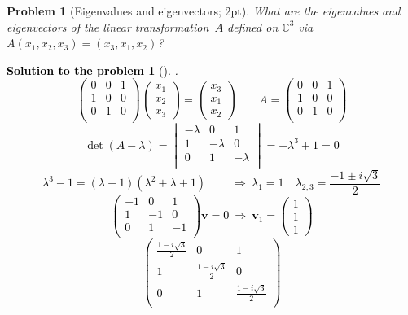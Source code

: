 \documentclass[12pt,a4]{article}
\newtheorem{problem}{Problem}
\newtheorem{solution}{Solution to the problem}
\newcommand{\bv}{{\mathbf v}}
\begin{document}
\begin{problem}[Eigenvalues and eigenvectors; 2pt]\rm 
		What are the eigenvalues and eigenvectors of the
		linear transformation~$A$ defined on $\mathbb{C}^3$ via
 	$A(x_1,x_2,x_3) =  (x_3,x_1,x_2)$?
\end{problem}

\textcolor{black}{
\begin{solution}[]\rm .
\[
\begin{pmatrix}
0 & 0 & 1 \\
1 & 0 & 0 \\
0 & 1 & 0 \\
\end{pmatrix}
\begin{pmatrix}
x_1 \\ x_2 \\ x_3
\end{pmatrix}
=
\begin{pmatrix}
x_3 \\ x_1 \\ x_2
\end{pmatrix}
\qquad
A = 
\begin{pmatrix}
0 & 0 & 1 \\
1 & 0 & 0 \\
0 & 1 & 0 \\
\end{pmatrix}
\]
\[
\det (A - \lambda) = 
\begin{vmatrix}
-\lambda & 0 & 1 \\
1 & -\lambda & 0 \\
0 & 1 & -\lambda \\
\end{vmatrix} = -\lambda^3 + 1 = 0
\]
\[
\lambda^3 - 1 = (\lambda - 1)(\lambda^2 + \lambda + 1)
\qquad
~\Rightarrow~
\lambda_1 = 1
\quad
\lambda_{2,3} = \frac{-1 \pm i\sqrt3}2
\]
\[
\begin{pmatrix}
-1 & 0 & 1 \\
1 & -1 & 0 \\
0 & 1 & -1 \\
\end{pmatrix}
\bv = 0
~\Rightarrow~
\bv_1 =
\begin{pmatrix}
1 \\ 1 \\ 1
\end{pmatrix}
\]
\[
\begin{pmatrix}
\frac{1 - i\sqrt3}2 & 0 & 1 \\
1 & \frac{1 - i\sqrt3}2 & 0 \\
0 & 1 & \frac{1 - i\sqrt3}2 \\

\end{pmatrix}\]
\end{solution}}
\end{document}
